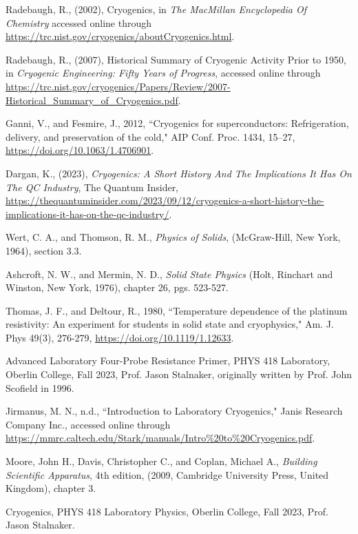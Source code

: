 \documentclass[11pt,letterpaper]{article}
\begin{document}
\begin{thebibliography}{99}
 Radebaugh, R., (2002), Cryogenics, in \textit{The MacMillan Encyclopedia Of Chemistry} accessed online through \url{https://trc.nist.gov/cryogenics/aboutCryogenics.html}.

 Radebaugh, R., (2007), Historical Summary of Cryogenic Activity Prior to 1950, in \textit{Cryogenic Engineering: Fifty Years of Progress}, accessed online through \url{https://trc.nist.gov/cryogenics/Papers/Review/2007-Historical_Summary_of_Cryogenics.pdf}.

 Ganni, V., and Fesmire, J., 2012, ``Cryogenics for superconductors: Refrigeration, delivery, and preservation of the cold," AIP Conf. Proc. 1434, 15–27, \url{https://doi.org/10.1063/1.4706901}.

 Dargan, K., (2023), \textit{Cryogenics: A Short History And The Implications It Has On The QC Industry}, The Quantum Insider, \url{https://thequantuminsider.com/2023/09/12/cryogenics-a-short-history-the-implications-it-has-on-the-qc-industry/}.

 Wert, C. A., and Thomson, R. M., \textit{Physics of Solids}, (McGraw-Hill, New York, 1964), section 3.3.

 Ashcroft, N. W., and Mermin, N. D., \textit{Solid State Physics} (Holt, Rinchart and Winston, New York, 1976), chapter 26, pgs. 523-527.

 Thomas, J. F., and Deltour, R., 1980, ``Temperature dependence of the platinum resistivity: An experiment for students in solid state and cryophysics," Am. J. Phys 49(3), 276-279, \url{https://doi.org/10.1119/1.12633}.

 Advanced Laboratory Four-Probe Resistance Primer, PHYS 418 Laboratory, Oberlin College, Fall 2023, Prof. Jason Stalnaker, originally written by Prof. John Scofield in 1996.

 Jirmanus, M. N., n.d., ``Introduction to Laboratory Cryogenics," Janis Research Company Inc., accessed online through \url{https://mmrc.caltech.edu/Stark/manuals/Intro%20to%20Cryogenics.pdf}. 

 Moore, John H., Davis, Christopher C., and Coplan, Michael A., \textit{Building Scientific Apparatus}, 4th edition, (2009, Cambridge University Press, United Kingdom), chapter 3.


 Cryogenics, PHYS 418 Laboratory Physics, Oberlin College, Fall 2023, Prof. Jason Stalnaker.

\end{thebibliography}
\end{document}
